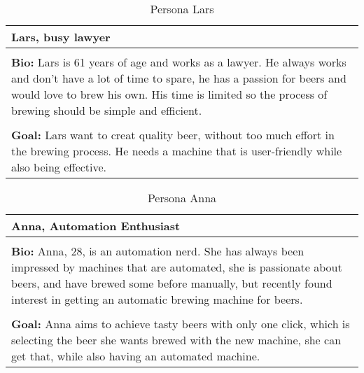 \begin{table}[htb]
    \begin{center}
        \begin{tabular}{|p{16cm}|}
            \hline
            \textbf{Lars, busy lawyer}                                                                                                                                           \\
            \hline
            \\ \textbf{Bio:} Lars is 61 years of age and works as a lawyer. He always works and don't have a lot of time to spare, he has a passion for beers and would love to brew his own. His time is limited so the process of brewing should be simple and efficient.  \\
            \\
            \textbf{Goal:} Lars want to creat quality beer, without too much effort in the brewing process. He needs a machine that is user-friendly while also being effective. \\
            \hline
        \end{tabular}
        \caption{Persona Lars}
        \label{tab:persona_lars}
    \end{center}
\end{table}

\begin{table}[htb]
    \begin{center}
        \begin{tabular}{|p{16cm}|}
            \hline
            \textbf{Anna, Automation Enthusiast}                                                                                                                                                              \\
            \hline
            \\ \textbf{Bio:} Anna, 28, is an automation nerd. She has always been impressed by machines that are automated, she is passionate about beers, and have brewed some before manually, but recently found interest in getting an automatic brewing machine for beers.  \\
            \\
            \textbf{Goal:} Anna aims to achieve tasty beers with only one click, which is selecting the beer she wants brewed with the new machine, she can get that, while also having an automated machine. \\
            \hline
        \end{tabular}
        \caption{Persona Anna}
        \label{tab:persona_anna}
    \end{center}
\end{table}

